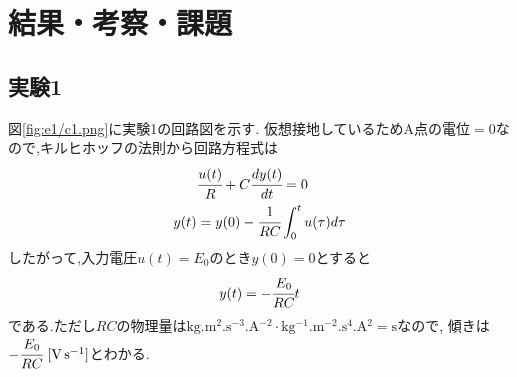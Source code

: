 \section{結果・考察・課題}
\subsection{実験1}
図\ref{fig:e1/c1.png}に実験1の回路図を示す.
仮想接地しているため$\mathrm{A}点の電位=0$なので,キルヒホッフの法則から回路方程式は
\begin{align}
  \label{equ:c1}
  &\cfrac{u(t)}{R}+C\cfrac{dy(t)}{dt}=0\\
  y(t)&=y(0)-\cfrac{1}{RC}\int^t_0u(\tau)d\tau
\end{align}
したがって,入力電圧$u(t)=E_0$のとき$y(0)=0$とすると
\begin{align}
  \label{equ:c1_y(t)}
  y(t)=-\cfrac{E_0}{RC}t
\end{align}
である.ただし$RC$の物理量は$\si{\kilo\gram.\metre^{2}.\second^{-3}.\ampere^{-2}}\cdot\si{\kilo\gram^{-1}.\metre^{-2}.\second^{4}.\ampere^{2}}=\si{\second}$なので,
傾きは$-\cfrac{E_0}{RC}~[\si{\volt.\second^{-1}}]$とわかる.
